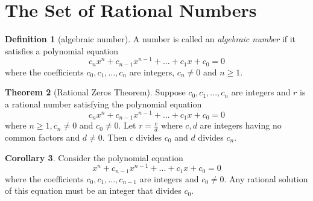 \documentclass{book}
\theoremstyle{definition}
\newtheorem{definition}{Definition}[section]
\newtheorem{theorem}[definition]{Theorem}
\newtheorem{corollary}[definition]{Corollary}
\begin{document}
\section{The Set of Rational Numbers}
\begin{definition}[algebraic number]
A number is called an \textit{algebraic number} if it satisfies a polynomial equation
\begin{equation*}
    c_nx^n + c_{n-1}x^{n-1} + ... + c_1x + c_0 = 0
\end{equation*}
where the coefficients $c_0, c_1, ..., c_n$ are integers, $c_n \neq 0$ and $n \geq 1$.
\end{definition}
\begin{theorem}[Rational Zeros Theorem]
Suppose $c_0, c_1,...,c_n$ are integers and $r$ is a rational number satisfying the polynomial equation
\begin{equation}
    c_nx^n + c_{n-1}x^{n-1} + ... + c_1x + c_0 = 0
\end{equation}
where $n \geq 1, c_n \neq 0$ and $c_0 \neq 0$. Let $r = \frac{c}{d}$ where $c,d$ are integers having no common factors and $d \neq 0$. Then $c$ divides $c_0$ and $d$ divides $c_n$.
\end{theorem}
\begin{corollary}
Consider the polynomial equation
\begin{equation*}
    x^n + c_{n-1}x^{n-1} + ... + c_1x + c_0 = 0
\end{equation*}
where the coefficients $c_0, c_1, ..., c_{n-1}$ are integers and $c_0 \neq 0$. Any rational solution of this equation must be an integer that divides $c_0$.
\end{corollary}
\end{document}

